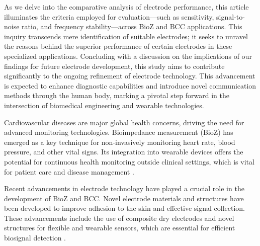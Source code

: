 {

As we delve into the comparative analysis of electrode performance, this article illuminates the criteria employed for evaluation—such as sensitivity, signal-to-noise ratio, and frequency stability—across BioZ and BCC applications. This inquiry transcends mere identification of suitable electrodes; it seeks to unravel the reasons behind the superior performance of certain electrodes in these specialized applications. Concluding with a discussion on the implications of our findings for future electrode development, this study aims to contribute significantly to the ongoing refinement of electrode technology. This advancement is expected to enhance diagnostic capabilities and introduce novel communication methods through the human body, marking a pivotal step forward in the intersection of biomedical engineering and wearable technologies.




Cardiovascular diseases are major global health concerns, driving the need for advanced monitoring technologies. Bioimpedance measurement (BioZ) has emerged as a key technique for non-invasively monitoring heart rate, blood pressure, and other vital signs. Its integration into wearable devices offers the potential for continuous health monitoring outside clinical settings, which is vital for patient care and disease management \cite{rabbani2023low, ormanis2020towards, zaira2023prediction}.

Recent advancements in electrode technology have played a crucial role in the development of BioZ and BCC. Novel electrode materials and structures have been developed to improve adhesion to the skin and effective signal collection. These advancements include the use of composite dry electrodes and novel structures for flexible and wearable sensors, which are essential for efficient biosignal detection \cite{lee2021recent}.

}

